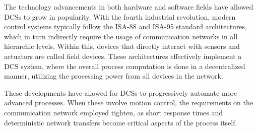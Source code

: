 The technology advancements in both hardware and software fields have allowed DCSs to grow in popularity.
With the fourth industrial revolution, modern control systems typically follow the ISA-88 \cite{standard:isa88} and ISA-95 \cite{standard:isa95} standard architectures, which in turn indirectly require the usage of communication networks in all hierarchic levels.
Within this, devices that directly interact with sensors and actuators are called field devices.
These architectures effectively implement a DCS system, where the overall process computation is done in a decentralized manner, utilizing the processing power from all devices in the network.


These developments have allowed for DCSs to progressively automate more advanced processes.
When these involve motion control, the requirements on the communication network employed tighten, as short response times and deterministic network transfers become critical aspects of the process itself.

